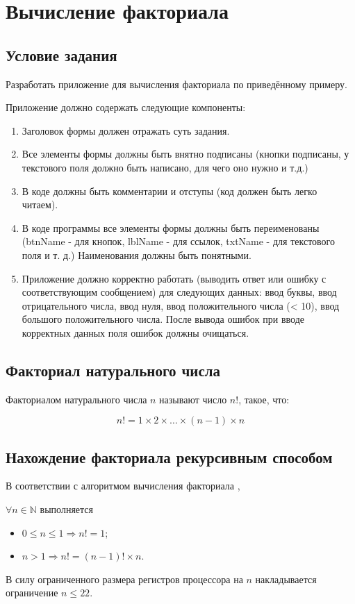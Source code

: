 \section{Вычисление факториала}
\subsection{Условие задания}
Разработать приложение для вычисления факториала по приведённому примеру.

Приложение должно содержать следующие компоненты:

\begin{enumerate}
  \item Заголовок формы должен отражать суть задания.
  \item Все элементы формы должны быть внятно подписаны (кнопки подписаны, у текстового поля должно быть написано, для чего оно нужно и т.д.)
  \item В коде должны быть комментарии и отступы (код должен быть легко читаем).
  \item В коде программы все элементы формы должны быть переименованы (btnName -  для кнопок, lblName - для ссылок, txtName - для текстового поля и т. д.) Наименования должны быть понятными.
  \item Приложение должно корректно работать (выводить ответ или ошибку с соответствующим сообщением) для следующих данных: ввод буквы, ввод отрицательного числа, ввод нуля, ввод положительного числа (< 10), ввод большого положительного числа. После вывода ошибок при вводе корректных данных поля ошибок должны очищаться.
\end{enumerate}

\subsection{Факториал натурального числа}
Факториалом натурального числа $n$ называют число $n!$, такое, что:

\begin{equation}
  n! = 1 \times 2 \times \dots \times (n - 1) \times n
\end{equation}

\subsection{Нахождение факториала рекурсивным способом}
В соответствии с алгоритмом вычисления факториала \cite{factorial-calculation},

$\forall n \in \mathbb{N} \text{ выполняется}$
\begin{itemize}
  \item $0 \leqslant n \leqslant 1 \Rightarrow n! = 1$;
  \item $n > 1 \Rightarrow n! = (n-1)!\times n$.
\end{itemize}
В силу ограниченного размера регистров процессора на $n$ накладывается ограничение $n \leq 22$.

